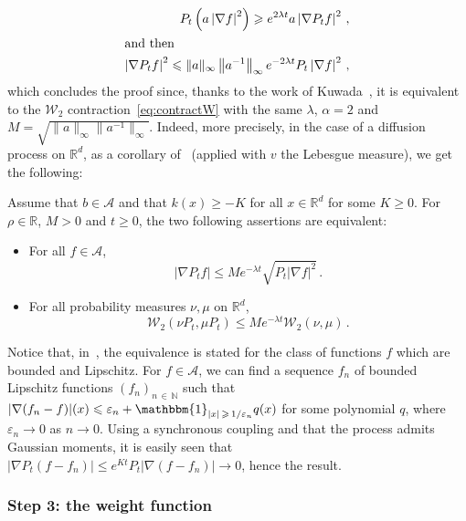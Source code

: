 \documentclass[AHL,Unicode,longabstracts,published]{cedram}
\newcommand{\R}{\mathbb R}
\newcommand{\A}{\mathcal A}
\newcommand{\clW}{\mathcal W}
\newcommand{\N}{\mathbb N}
\newcommand{\na}{\nabla}
\newcommand{\1}{\mathbbm{1}}
\newcommand{\R}{\mathbb R}
\newcommand{\clW}{\mathcal W}
\begin{document}
\begin{align*}
P_t\left( a\left|\na f\right|^2\right) \geqslant e^{2\lambda t} a \left|\na P_t f\right|^2\,,
\\
\intertext{and then}
\left|\na P_t f\right|^2 \leqslant \|a\|_\infty \left\| a^{-1}\right\|_\infty e^{-2\lambda t} P_t\left|\na f\right|^2\,,
\end{align*}
which concludes the proof since, thanks to the work of Kuwada~\cite{Kuwada1,Kuwada2}, it is equivalent to the $\clW_2$ contraction~\eqref{eq:contractW} with the same $\lambda$, $\alpha=2$ and $M = \sqrt{\|a\|_\infty \| a^{-1}\|_\infty }$. Indeed, more precisely, in the case of a diffusion process on $\R^d$, as a corollary of~\cite[Theorem~2.2]{Kuwada1} (applied with $v$ the Lebesgue measure), we get the following:

\begin{prop}\label{prop:kuwada}
Assume that $b\in \A$ and that $k(x) \geqslant - K$ for all $x\in\R^d$ for some $K\geqslant 0$. For $\rho\in\R$, $M>0$ and $t\geqslant 0$, the two following assertions are equivalent:
\begin{itemize}
\item For all $f\in\A$,
\[
\left|\na P_t f\right| \leqslant M e^{-\lambda t} \sqrt{P_t\left|\na f\right|^2}\,.
\]
\item For all probability measures $\nu,\mu$ on $\R^d$,
\[
\clW_2\left(\nu P_t,\mu P_t\right) \leqslant M e^{-\lambda t} \clW_2(\nu,\mu)\,.
\]
\end{itemize}
\end{prop}

Notice that, in~\cite[Theorem~2.2]{Kuwada1}, the equivalence is stated for the class of functions $f$ which are bounded and Lipschitz. For $f\in\A$, we can find a sequence $f_n$ of bounded Lipschitz functions $(f_n)_{n\,\in\,\N}$ such that $|\na (f_n - f)|(x) \leqslant \varepsilon_n + \1_{|x|\,\geqslant\,1/\varepsilon_n} q(x)$ for some polynomial $q$, where $\varepsilon_n \rightarrow 0$ as $n\rightarrow 0$. Using a synchronous coupling and that the process admits Gaussian moments, it is easily seen that $|\na P_t (f-f_n)| \leqslant e^{Kt} P_t|\na (f-f_n)| \rightarrow 0 $, hence the result.

\subsubsection{Step 3: the weight function}
\end{document}
